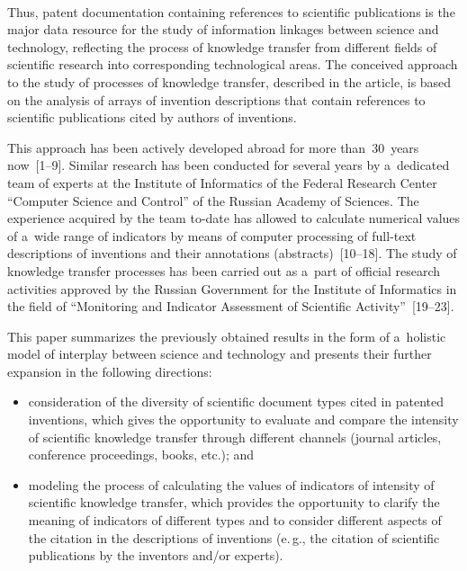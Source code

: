 \begin{multicols}{2}
\begin{figure*}[b] %
 \vspace*{1pt}
\begin{center}
\mbox{%
\epsfxsize=110.156mm
}
\end{center}
\vspace*{-9pt}
\end{figure*}
    
    Thus, patent documentation containing references to scientific publications is 
the major data resource for the study of information linkages between science and 
technology, reflecting the process of knowledge transfer from different fields of 
scientific research into corresponding technological areas. The conceived approach to 
the study of processes of knowledge transfer, described in the article, is based on the 
analysis of arrays of invention descriptions that contain references to scientific 
publications cited by authors of inventions.
    
    This approach has been actively developed abroad for more than~30~years 
    now~[1--9]. Similar research has been 
conducted for several years by a~dedicated team of experts at the Institute of 
Informatics of the Federal Research Center ``Computer Science and Control'' of the 
Russian Academy of Sciences. The experience acquired by the team to-date has 
allowed to calculate numerical values of a~wide range of indicators by means of 
computer processing of full-text descriptions of inventions and their annotations 
(abstracts)~[10--18]. The study of knowledge transfer processes has been carried out 
as a~part of official research activities approved by the Russian Government for the 
Institute of Informatics in the field of ``Monitoring and Indicator Assessment of 
Scientific Activity''~[19--23].
    
    This paper summarizes the previously obtained results in the form of a~holistic 
model of interplay between science and technology and presents their further 
expansion in the following directions:
    \begin{itemize}
\item consideration of the diversity of scientific document types cited in 
patented inventions, which gives the opportunity to evaluate and compare the 
intensity of scientific knowledge transfer through different channels (journal 
articles, conference proceedings, books, etc.); and
\item modeling the process of calculating the values of indicators of intensity of 
scientific knowledge transfer, which provides the opportunity to clarify the 
meaning of indicators of different types and to consider different aspects of the 
citation in the descriptions of inventions (e.\,g., the citation of scientific 
publications by the inventors and/or experts).
\end{itemize}


\end{multicols}
